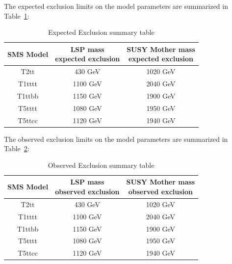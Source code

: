 The expected exclusion limits on the model parameters are summarized in Table~\ref{tab:c4limitsummary_exp}:

\begin{table}[htbp]
\fontsize{10 pt}{1.2 em}
\selectfont
\begin{centering}
\caption{\label{tab:c4limitsummary_exp} Expected Exclusion summary table}
\hspace*{-4ex}
\begin{tabular}{|c|c|c|}
\hline
SMS Model & \specialcell{LSP mass \\ expected exclusion} & \specialcell{SUSY Mother mass \\ expected exclusion} \\
\hline
T2tt & 430 GeV & 1020 GeV \\
\hline
T1tttt & 1100 GeV & 2040 GeV \\
\hline
T1ttbb & 1150 GeV & 1900 GeV \\
\hline
T5tttt & 1080 GeV & 1950 GeV \\
\hline
T5ttcc & 1120 GeV & 1940 GeV \\
\hline
\end{tabular}
\par\end{centering}
\end{table}

The observed exclusion limits on the model parameters are summarized in Table~\ref{tab:c4limitsummary_obs}:

\begin{table}[htbp]
\fontsize{10 pt}{1.2 em}
\selectfont
\begin{centering}
\caption{\label{tab:c4limitsummary_obs} Observed Exclusion summary table}
\hspace*{-4ex}
\begin{tabular}{|c|c|c|}
\hline
SMS Model & \specialcell{LSP mass \\ observed exclusion} & \specialcell{SUSY Mother mass \\ observed exclusion} \\
\hline
T2tt & 430 GeV & 1020 GeV \\
\hline
T1tttt & 1100 GeV & 2040 GeV \\
\hline
T1ttbb & 1150 GeV & 1900 GeV \\
\hline
T5tttt & 1080 GeV & 1950 GeV \\
\hline
T5ttcc & 1120 GeV & 1940 GeV \\
\hline
\end{tabular}
\par\end{centering}
\end{table}



